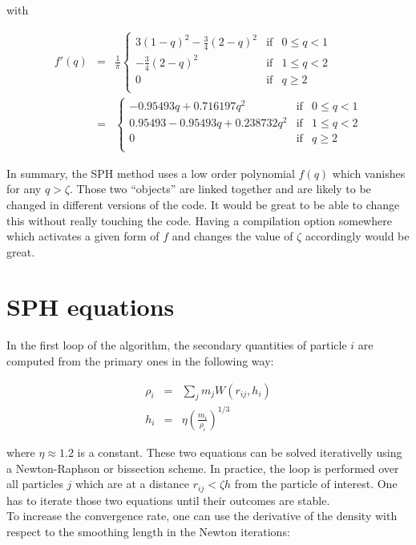 \documentclass[a4paper,10pt]{article}
\begin{document}
with

\begin{eqnarray*}
  f'(q)&=& \frac{1}{\pi}\left\lbrace \begin{array}{rcl}
                      3 \left(1-q\right)^2-\frac{3}{4} \left(2-q\right)^2 & \mbox{if} &
0 \leq q < 1 \\
 		      -\frac{3}{4} \left(2-q\right)^2 & \mbox{if} & 1 \leq q < 2 \\
		      0 & \mbox{if} & q \geq 2 \\
                     \end{array}
 \right. \\
&=&\left\lbrace \begin{array}{rcl}
    -0.95493 q + 0.716197 q^2& \mbox{if} & 0 \leq q < 1 \\
   0.95493 -0.95493 q+0.238732 q^2  & \mbox{if} & 1 \leq q < 2 \\
		      0 & \mbox{if} & q \geq 2 \\
                     \end{array}
 \right.
\end{eqnarray*}

In summary, the SPH method uses a low order polynomial $f(q)$ which vanishes for any $q>\zeta$. Those two ``objects''
are linked together and are likely to be changed in different versions of the code. It would be great to be able to
change this without really touching the code. 
Having a compilation option somewhere which activates a given form of $f$ and changes the value of $\zeta$ accordingly
would be great.

\section{SPH equations}

In the first loop of the algorithm, the secondary quantities of particle $i$ are computed from the primary ones in the
following way:

\begin{eqnarray}
 \rho_i &=& \sum_j m_j W(r_{ij}, h_i)\\
 h_i &=& \eta \left(\frac{m_i}{\rho_i} \right)^{1/3}
\end{eqnarray}

where $\eta \approx 1.2$ is a constant. These two equations can be solved iterativelly using a Newton-Raphson or
bissection scheme. In practice, the loop is performed over all particles $j$ which are at a distance $r_{ij}<\zeta
h$ from the particle of interest. One has to iterate those two equations until their outcomes are stable. \\
To increase the convergence rate, one can use the derivative of the density with respect to the smoothing length in the
Newton iterations:
\end{document}
